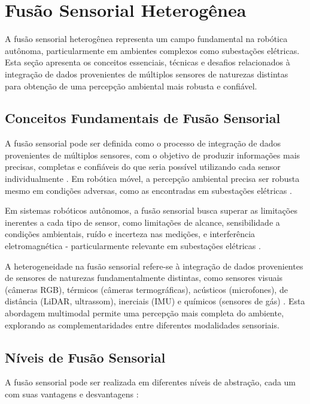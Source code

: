 \section{Fusão Sensorial Heterogênea}

A fusão sensorial heterogênea representa um campo fundamental na robótica autônoma, particularmente em ambientes complexos como subestações elétricas. Esta seção apresenta os conceitos essenciais, técnicas e desafios relacionados à integração de dados provenientes de múltiplos sensores de naturezas distintas para obtenção de uma percepção ambiental mais robusta e confiável.

\subsection{Conceitos Fundamentais de Fusão Sensorial}

A fusão sensorial pode ser definida como o processo de integração de dados provenientes de múltiplos sensores, com o objetivo de produzir informações mais precisas, completas e confiáveis do que seria possível utilizando cada sensor individualmente \cite{Hall1997}. Em robótica móvel, a percepção ambiental precisa ser robusta mesmo em condições adversas, como as encontradas em subestações elétricas \cite{Oliveira2021EstudoAplicacao}.

Em sistemas robóticos autônomos, a fusão sensorial busca superar as limitações inerentes a cada tipo de sensor, como limitações de alcance, sensibilidade a condições ambientais, ruído e incerteza nas medições, e interferência eletromagnética - particularmente relevante em subestações elétricas \cite{Liu2016EMC}.

A heterogeneidade na fusão sensorial refere-se à integração de dados provenientes de sensores de naturezas fundamentalmente distintas, como sensores visuais (câmeras \ac{RGB}), térmicos (câmeras termográficas), acústicos (microfones), de distância (\ac{LiDAR}, ultrassom), inerciais (\ac{IMU}) e químicos (sensores de gás) \cite{Kim2023MultimodalFusion}. Esta abordagem multimodal permite uma percepção mais completa do ambiente, explorando as complementaridades entre diferentes modalidades sensoriais.

\subsection{Níveis de Fusão Sensorial}

A fusão sensorial pode ser realizada em diferentes níveis de abstração, cada um com suas vantagens e desvantagens \cite{Costa2018ImplementacaoFusao, Santos2023FusaoSensorial}:

